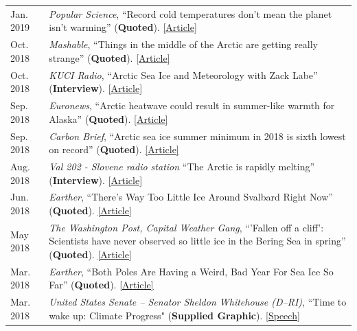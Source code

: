 \documentclass[margin,line,palatino,courier,10pt]{res}
\begin{document}
\begin{resume}
\begin{tabular}{@{}p{0.9in}p{4in}}
Jan. 2019 & \textit{Popular Science}, ``Record cold temperatures don't mean the planet isn't warming'' (\textbf{Quoted}). \href{https://www.popsci.com/cold-weather-climate-change}{[Article]}\\
Oct. 2018 & \textit{Mashable}, ``Things in the middle of the Arctic are getting really strange'' (\textbf{Quoted}). \href{https://mashable.com/article/low-arctic-ice-central-basin/#xQmvXhcFJPqH}{[Article]}\\
Oct. 2018 & \textit{KUCI Radio}, ``Arctic Sea Ice and Meteorology with Zack Labe'' (\textbf{Interview}). \href{https://thesciencespiel.org/2018/10/08/october-8-2018-arctic-sea-ice-and-meteorology-with-zack-labe/}{[Article]}\\
Sep. 2018 & \textit{Euronews}, ``Arctic heatwave could result in summer-like warmth for Alaska'' (\textbf{Quoted}). \href{https://www.euronews.com/2018/09/29/arctic-heatwave-could-result-in-summer-like-warmth-in-alaska}{[Article]}\\
Sep. 2018 & \textit{Carbon Brief}, ``Arctic sea ice summer minimum in 2018 is sixth lowest on record'' (\textbf{Quoted}). \href{https://www.carbonbrief.org/arctic-sea-ice-summer-minimum-in-2018-is-sixth-lowest-on-record}{[Article]}\\
Aug. 2018 & \textit{Val 202 - Slovene radio station} ``The Arctic is rapidly melting'' (\textbf{Interview}). \href{https://val202.rtvslo.si/2018/08/sonce-je-odprlo-zemljin-hladilnik/}{[Article]}\\
Jun. 2018 & \textit{Earther}, ``There's Way Too Little Ice Around Svalbard Right Now'' (\textbf{Quoted}). \href{https://earther.com/theres-way-too-little-ice-around-svalbard-right-now-1826567780}{[Article]}\\
May 2018 & \textit{The Washington Post, Capital Weather Gang}, ``'Fallen off a cliff': Scientists have never observed so little ice in the Bering Sea in spring'' (\textbf{Quoted}). \href{https://www.washingtonpost.com/news/capital-weather-gang/wp/2018/05/03/fallen-off-a-cliff-scientists-have-never-observed-so-little-ice-in-the-bering-sea-in-spring/?noredirect=on&utm_term=.cbcf2781b5e4}{[Article]}\\
Mar. 2018 & \textit{Earther}, ``Both Poles Are Having a Weird, Bad Year For Sea Ice So Far'' (\textbf{Quoted}). \href{https://earther.com/both-poles-are-having-a-weird-bad-year-for-sea-ice-so-1824074352}{[Article]}\\
Mar. 2018 & \textit{United States Senate -- Senator Sheldon Whitehouse (D--RI)}, ``Time to wake up: Climate Progress" (\textbf{Supplied Graphic}). \href{https://www.youtube.com/watch?v=C_E5OQgt2SE}{[Speech]}\\

\end{tabular}
\end{resume}
\end{document}
